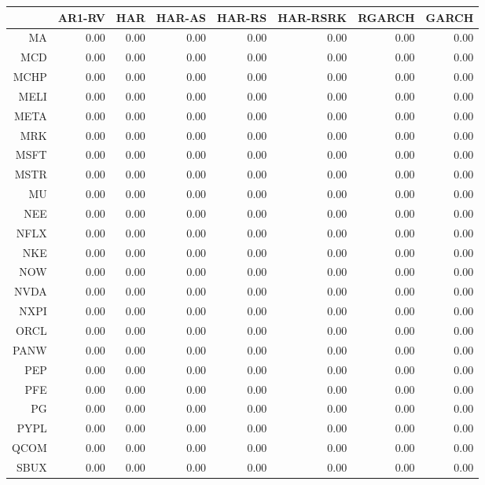 \begin{table}[ht]
\centering
\begin{tabular}{rrrrrrrr}
  \hline
 & AR1-RV & HAR & HAR-AS & HAR-RS & HAR-RSRK & RGARCH & GARCH \\ 
  \hline
MA & 0.00 & 0.00 & 0.00 & 0.00 & 0.00 & 0.00 & 0.00 \\ 
  MCD & 0.00 & 0.00 & 0.00 & 0.00 & 0.00 & 0.00 & 0.00 \\ 
  MCHP & 0.00 & 0.00 & 0.00 & 0.00 & 0.00 & 0.00 & 0.00 \\ 
  MELI & 0.00 & 0.00 & 0.00 & 0.00 & 0.00 & 0.00 & 0.00 \\ 
  META & 0.00 & 0.00 & 0.00 & 0.00 & 0.00 & 0.00 & 0.00 \\ 
  MRK & 0.00 & 0.00 & 0.00 & 0.00 & 0.00 & 0.00 & 0.00 \\ 
  MSFT & 0.00 & 0.00 & 0.00 & 0.00 & 0.00 & 0.00 & 0.00 \\ 
  MSTR & 0.00 & 0.00 & 0.00 & 0.00 & 0.00 & 0.00 & 0.00 \\ 
  MU & 0.00 & 0.00 & 0.00 & 0.00 & 0.00 & 0.00 & 0.00 \\ 
  NEE & 0.00 & 0.00 & 0.00 & 0.00 & 0.00 & 0.00 & 0.00 \\ 
  NFLX & 0.00 & 0.00 & 0.00 & 0.00 & 0.00 & 0.00 & 0.00 \\ 
  NKE & 0.00 & 0.00 & 0.00 & 0.00 & 0.00 & 0.00 & 0.00 \\ 
  NOW & 0.00 & 0.00 & 0.00 & 0.00 & 0.00 & 0.00 & 0.00 \\ 
  NVDA & 0.00 & 0.00 & 0.00 & 0.00 & 0.00 & 0.00 & 0.00 \\ 
  NXPI & 0.00 & 0.00 & 0.00 & 0.00 & 0.00 & 0.00 & 0.00 \\ 
  ORCL & 0.00 & 0.00 & 0.00 & 0.00 & 0.00 & 0.00 & 0.00 \\ 
  PANW & 0.00 & 0.00 & 0.00 & 0.00 & 0.00 & 0.00 & 0.00 \\ 
  PEP & 0.00 & 0.00 & 0.00 & 0.00 & 0.00 & 0.00 & 0.00 \\ 
  PFE & 0.00 & 0.00 & 0.00 & 0.00 & 0.00 & 0.00 & 0.00 \\ 
  PG & 0.00 & 0.00 & 0.00 & 0.00 & 0.00 & 0.00 & 0.00 \\ 
  PYPL & 0.00 & 0.00 & 0.00 & 0.00 & 0.00 & 0.00 & 0.00 \\ 
  QCOM & 0.00 & 0.00 & 0.00 & 0.00 & 0.00 & 0.00 & 0.00 \\ 
  SBUX & 0.00 & 0.00 & 0.00 & 0.00 & 0.00 & 0.00 & 0.00 \\ 

\end{tabular}
\end{table}
